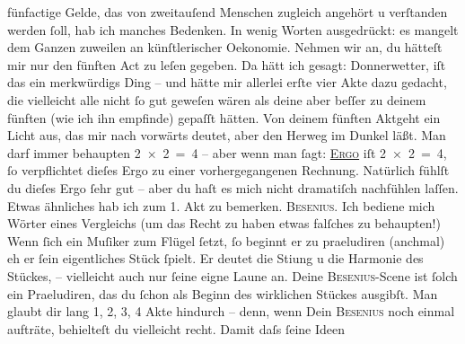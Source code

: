 \begin{ledgroupsized}[t]{13cm}
               fünfactige Gelde, das von zweitauſend Menschen zugleich angehört u verſtanden werden
               ſoll, hab ich manches Bedenken. In wenig Worten ausgedrückt: {\pb}es mangelt dem Ganzen
               zuweilen an künſtlerischer Oekonomie. Nehmen wir an, du hätteſt mir nur den fünften
               Act zu leſen gegeben. Da hätt ich gesagt: Donnerwetter, iſt das ein merkwürdigs Ding
               – und hätte mir allerlei erſte vier Akte dazu gedacht, die vielleicht alle nicht ſo
               gut geweſen wären als deine  aber beſſer zu deinem fünften (wie ich ihn empfinde) gepaſſt hätten.
               Von deinem fünften Aktgeht ein Licht aus,
               das mir nach vorwärts deutet, aber den Herweg im Dunkel läßt. Man darf immer
               behaupten 2 × 2 = 4 – aber wenn man ſagt: \textsc{\uline{Ergo}} iſt 2 × 2 = 4, ſo verpflichtet dieſes Ergo zu einer vorhergegangenen Rechnung.
               Natürlich fühlſt du dieſes Ergo ſehr gut – aber du haſt es mich nicht dramatiſch
               nachfühlen laſſen. Etwas ähnliches hab ich zum 1. Akt zu bemerken. \textsc{Besenius}. {\pb}Ich bediene
               mich Wörter eines Vergleichs (um das Recht zu haben etwas falſches zu behaupten!)
               Wenn ſich ein Muſiker zum Flügel ſetzt, ſo beginnt er zu praeludiren (anchmal) eh er ſein eigentliches Stück ſpielt. Er deutet die Sti{\geminationm}ung u die Harmonie des Stückes, – vielleicht auch nur
               ſeine eigne Laune an. Deine \textsc{Besenius}-Scene ist ſolch ein Praeludiren, das du ſchon als Beginn des wirklichen Stückes
               ausgibſt. Man {\pb}glaubt
               dir lang {\dotstwo} 1, 2, 3, 4 Akte hindurch – denn, wenn Dein \textsc{Besenius} noch einmal aufträte, behielteſt du vielleicht recht. Damit daſs ſeine Ideen

\end{ledgroupsized}
